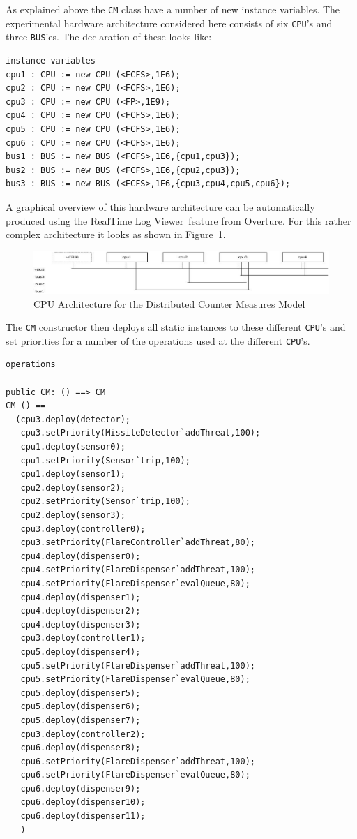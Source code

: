 \documentclass{overturerepchap}
\newcommand{\showtrace}{RealTime Log Viewer}
\begin{document}
As explained above the \texttt{CM} class have a number of new instance 
variables. The experimental hardware architecture considered here consists
of six \texttt{CPU}'s and three \texttt{BUS}'es. The declaration of these looks
like: 

\begin{lstlisting}
instance variables
cpu1 : CPU := new CPU (<FCFS>,1E6);
cpu2 : CPU := new CPU (<FCFS>,1E6);
cpu3 : CPU := new CPU (<FP>,1E9);
cpu4 : CPU := new CPU (<FCFS>,1E6);
cpu5 : CPU := new CPU (<FCFS>,1E6);
cpu6 : CPU := new CPU (<FCFS>,1E6);
bus1 : BUS := new BUS (<FCFS>,1E6,{cpu1,cpu3});
bus2 : BUS := new BUS (<FCFS>,1E6,{cpu2,cpu3});
bus3 : BUS := new BUS (<FCFS>,1E6,{cpu3,cpu4,cpu5,cpu6});
\end{lstlisting}

A graphical overview of this hardware architecture can be automatically
produced using the \showtrace\ feature from Overture. For this rather complex
architecture it looks as shown in Figure~\ref{fig:cpuarchitecture}.

\begin{figure}
\begin{center}
\includegraphics[width=\textwidth]{figures/cpuarchitecture.png}
\end{center}
\caption{CPU Architecture for the Distributed Counter Measures Model
\label{fig:cpuarchitecture}}
\end{figure}

The \texttt{CM} constructor then deploys all static instances to these
different \texttt{CPU}'s and set priorities for a number of the operations
used at the different \texttt{CPU}'s.

\begin{lstlisting}
operations

public CM: () ==> CM
CM () ==
  (cpu3.deploy(detector);
   cpu3.setPriority(MissileDetector`addThreat,100);
   cpu1.deploy(sensor0);
   cpu1.setPriority(Sensor`trip,100);
   cpu1.deploy(sensor1);
   cpu2.deploy(sensor2);
   cpu2.setPriority(Sensor`trip,100);
   cpu2.deploy(sensor3);
   cpu3.deploy(controller0);
   cpu3.setPriority(FlareController`addThreat,80);
   cpu4.deploy(dispenser0);
   cpu4.setPriority(FlareDispenser`addThreat,100);
   cpu4.setPriority(FlareDispenser`evalQueue,80);
   cpu4.deploy(dispenser1);
   cpu4.deploy(dispenser2);
   cpu4.deploy(dispenser3);
   cpu3.deploy(controller1);
   cpu5.deploy(dispenser4);
   cpu5.setPriority(FlareDispenser`addThreat,100);
   cpu5.setPriority(FlareDispenser`evalQueue,80);
   cpu5.deploy(dispenser5);
   cpu5.deploy(dispenser6);
   cpu5.deploy(dispenser7);
   cpu3.deploy(controller2);
   cpu6.deploy(dispenser8);
   cpu6.setPriority(FlareDispenser`addThreat,100);
   cpu6.setPriority(FlareDispenser`evalQueue,80);
   cpu6.deploy(dispenser9);
   cpu6.deploy(dispenser10);
   cpu6.deploy(dispenser11);
   )
\end{lstlisting}
\end{document}
